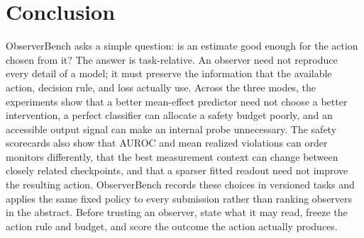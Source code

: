 \section{Conclusion}

ObserverBench asks a simple question: is an estimate good enough for the action
chosen from it? The answer is task-relative. An observer need not reproduce
every detail of a model; it must preserve the information that the available
action, decision rule, and loss actually use. Across the three modes, the
experiments show that a better mean-effect predictor need not choose a better
intervention, a perfect classifier can allocate a safety budget poorly, and an
accessible output signal can make an internal probe unnecessary. The safety
scorecards also show that AUROC and mean realized violations can order monitors
differently, that the best measurement context can change between closely
related checkpoints, and that a sparser fitted readout need not improve the
resulting action. ObserverBench records these choices in versioned tasks and applies the
same fixed policy to
every submission rather than ranking observers in the abstract. Before trusting
an observer, state what it may read, freeze the action rule and budget, and score
the outcome the action actually produces.
